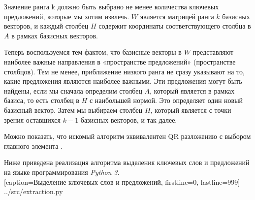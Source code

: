 Значение ранга k должно быть выбрано не менее количества ключевых предложений, которые мы хотим извлечь.
$W$ является матрицей ранга $k$ базисных векторов,
и каждый столбец $H$ содержит координаты соответствующего столбца в $A$ в рамках базисных векторов.

Теперь воспользуемся тем фактом, что базисные векторы в $W$ представляют наиболее важные направления в «пространстве предложений» (пространстве столбцов).
Тем не менее, приближение низкого ранга не сразу указывают на то, какие предложения являются наиболее важными.
Эти предложения могут быть найдены, если мы сначала определим столбец $A$, который является  в рамках базиса,
то есть столбец в $H$ с наибольшей нормой. Это определяет один новый базисный вектор.
Затем мы выбираем столбец $H$, который является  с точки зрения оставшихся $k-1$ базисных векторов, и так далее.

Можно показать, что искомый алгоритм эквивалентен QR разложению с выбором главного элемента \cite{blas}.

\newpage

Ниже приведена реализация алгоритма выделения ключевых слов и предложений на языке программирования \textit{Python 3}.
\\


  [caption=Выделение ключевых слов и предложений, firstline=0, lastline=999]
  {../src/extraction.py}

